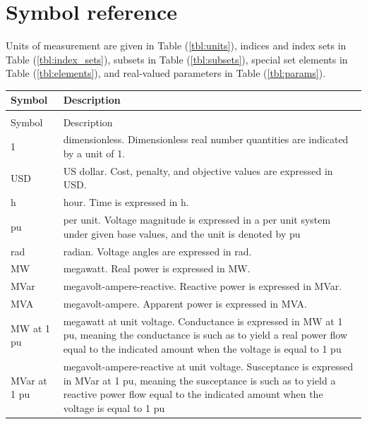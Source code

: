 \newcommand{\notationtable}[4]{
  {
    \begin{center}
      \begin{tabularx}{\linewidth}{l X}
        \caption[]{#3} #4\\
        \toprule
        #2 %
        \midrule
        \endfirsthead
        \caption[]{Continued} \\
        \toprule
        #2 %
        \midrule
        \endhead
        \bottomrule
        \endfoot
        \bottomrule
        \endlastfoot

        #1 %
      \end{tabularx}
    \end{center}
  }
}
\chapter{Symbol reference}\label{chap:symbref}

Units of measurement are given in Table (\ref{tbl:units}),
indices and index sets in Table (\ref{tbl:index_sets}),
subsets in Table (\ref{tbl:subsets}),
special set elements in Table (\ref{tbl:elements}), and
real-valued parameters in Table (\ref{tbl:params}).

\notationtable{
  1 & dimensionless. Dimensionless real number quantities are indicated by a unit of 1. \\
  USD & US dollar. Cost, penalty, and objective values are expressed in USD. \\
  h & hour. Time is expressed in h. \\
  pu & per unit. Voltage magnitude is expressed in a per unit system under given
  base values, and the unit is denoted by pu \\
  rad & radian. Voltage angles are expressed in rad. \\
  MW & megawatt. Real power is expressed in MW. \\
  MVar & megavolt-ampere-reactive. Reactive power is expressed in MVar. \\
  MVA & megavolt-ampere. Apparent power is expressed in MVA. \\
  MW at 1 pu & megawatt at unit voltage. Conductance is expressed in MW at 1 pu, meaning the conductance is such as to yield a real power flow equal to the indicated amount when the voltage is equal to 1 pu \\
  MVar at 1 pu & megavolt-ampere-reactive at unit voltage. Susceptance is expressed in MVar at 1 pu, meaning the susceptance is such as to yield a reactive power flow equal to the indicated amount when the voltage is equal to 1 pu \\
} {
  Symbol & Description \\
} {
  Units of measurement
} {
  \label{tbl:units}
}

